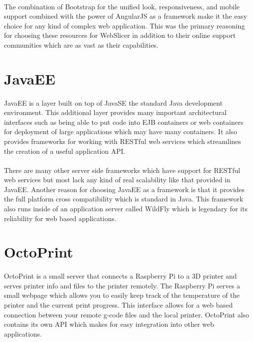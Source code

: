 \paragraph{}
The combination of Bootstrap for the unified look, responsiveness, and mobile support combined with the power of AngularJS as a framework make it the easy choice for any kind of complex web application.
This was the primary reasoning for choosing these resources for WebSlicer in addition to their online support communities which are as vast as their capabilities.

\section{JavaEE}
\paragraph{}
JavaEE is a layer built on top of JavaSE the standard Java development environment.
This additional layer provides many important architectural interfaces such as being able to put code into EJB containers or web containers for deployment of large applications which may have many containers. \cite{pilgrim-2013}
It also provides frameworks for working with RESTful web services which streamlines the creation of a useful application API.

\paragraph{}
There are many other server side frameworks which have support for RESTful web services but most lack any kind of real scalability like that provided in JavaEE.
Another reason for choosing JavaEE as a framework is that it provides the full platform cross compatibility which is standard in Java.
This framework also runs inside of an application server called WildFly which is legendary for its reliability for web based applications.

\section{OctoPrint}
\paragraph{}
OctoPrint is a small server that connects a Raspberry Pi to a 3D printer and serves printer info and files to the printer remotely.
The Raspberry Pi serves a small webpage which allows you to easily keep track of the temperature of the printer and the current print progress.
This interface allows for a web based connection between your remote g-code files and the local printer. \cite{mastering3Dprinting}
OctoPrint also contains its own API which makes for easy integration into other web applications.

